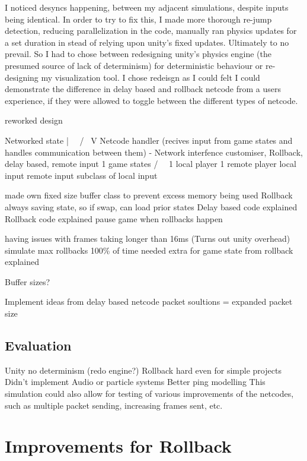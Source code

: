\documentclass{entcs}
\begin{document}
I noticed desyncs happening, between my adjacent simulations, despite inputs being identical. In order to try to fix this, I made more thorough re-jump detection, reducing parallelization in the code, manually ran physics updates for a set duration in stead of relying upon unity's fixed updates. Ultimately to no prevail. So I had to chose between redesigning unity's physics engine (the presumed source of lack of determinism) for deterministic behaviour or re-designing my visualization tool. I chose redeisgn as I could felt I could demonstrate the difference in delay based and rollback netcode from a users experience, if they were allowed to toggle between the different types of netcode.

reworked design

Networked state
 |                  \
\ /                  \
 V                    Netcode handler (recives input from game states and handles communication between them) - Network interfence customiser, Rollback, delay based, remote input
1 game states              
/             \                        \
1 local player   1 remote player        local input
 remote input subclass of local input

made own fixed size buffer class to prevent excess memory being used
Rollback always saving state, so if swap, can load prior states
Delay based code explained
Rollback code explained
pause game when rollbacks happen

having issues with frames taking longer than 16ms (Turns out unity overhead)
simulate max rollbacks 100\% of time
needed extra for game state from rollback explained

Buffer sizes?

Implement ideas from delay based netcode packet soultions = expanded packet size

\subsection{Evaluation}
Unity no determinism (redo engine?)
Rollback hard even for simple projects
Didn't implement Audio or particle systems
Better ping modelling
This simulation could also allow for testing of various improvements of the netcodes, such as multiple packet sending, increasing frames sent, etc.

\section{Improvements for Rollback}
\end{document}
